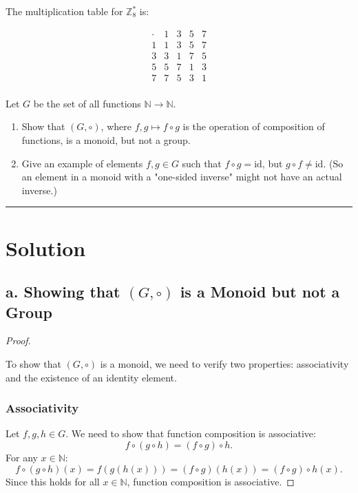 \documentclass[12pt]{amsart}
\theoremstyle{definition}
\numberwithin{equation}{section}
\newcommand{\N}{\mathbb{N}}
\begin{document}
\begin{exercise}{4}
The multiplication table for \(\mathbb{Z}_8^*\) is:

\[
\begin{array}{c|cccc}
  \cdot & 1 & 3 & 5 & 7 \\
  \hline
  1 & 1 & 3 & 5 & 7 \\
  3 & 3 & 1 & 7 & 5 \\
  5 & 5 & 7 & 1 & 3 \\
  7 & 7 & 5 & 3 & 1 \\
\end{array}
\]

\end{exercise}
\newpage

\begin{exercise}{5} 
Let \(G\) be the set of all functions \(\N \rightarrow \N\).
\begin{enumerate}[label=\textbf{\alph*.}]
    \item Show that \((G, \circ)\), where \(f, g \mapsto f \circ g\) is the operation of composition of functions, is a monoid, but not a group.

    \item Give an example of elements \(f, g \in G\) such that \(f \circ g = \text{id}\), but \(g \circ f \neq \text{id}\). (So an element in a monoid with a "one-sided inverse" might not have an actual inverse.)
\end{enumerate}

\noindent\rule{\linewidth}{1pt}

\section*{Solution}

\subsection*{\textbf{a. Showing that \((G, \circ)\) is a Monoid but not a Group}}

\begin{proof} \( \)

To show that \((G, \circ)\) is a monoid, we need to verify two properties: associativity and the existence of an identity element.

\subsubsection*{Associativity}
Let \(f, g, h \in G\). We need to show that function composition is associative:
\[
f \circ (g \circ h) = (f \circ g) \circ h.
\]
For any \(x \in \mathbb{N}\):
\[
f \circ (g \circ h)(x) = f(g(h(x))) = (f \circ g)(h(x)) = (f \circ g) \circ h (x).
\]
Since this holds for all \(x \in \mathbb{N}\), function composition is associative.


\end{proof}
\end{exercise}
\end{document}
